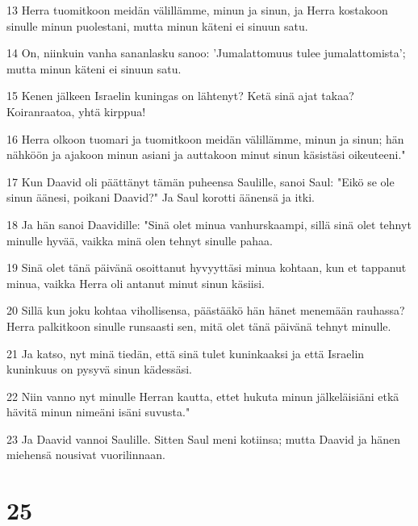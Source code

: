 \par 13 Herra tuomitkoon meidän välillämme, minun ja sinun, ja Herra kostakoon sinulle minun puolestani, mutta minun käteni ei sinuun satu.
\par 14 On, niinkuin vanha sananlasku sanoo: 'Jumalattomuus tulee jumalattomista'; mutta minun käteni ei sinuun satu.
\par 15 Kenen jälkeen Israelin kuningas on lähtenyt? Ketä sinä ajat takaa? Koiranraatoa, yhtä kirppua!
\par 16 Herra olkoon tuomari ja tuomitkoon meidän välillämme, minun ja sinun; hän nähköön ja ajakoon minun asiani ja auttakoon minut sinun käsistäsi oikeuteeni."
\par 17 Kun Daavid oli päättänyt tämän puheensa Saulille, sanoi Saul: "Eikö se ole sinun äänesi, poikani Daavid?" Ja Saul korotti äänensä ja itki.
\par 18 Ja hän sanoi Daavidille: "Sinä olet minua vanhurskaampi, sillä sinä olet tehnyt minulle hyvää, vaikka minä olen tehnyt sinulle pahaa.
\par 19 Sinä olet tänä päivänä osoittanut hyvyyttäsi minua kohtaan, kun et tappanut minua, vaikka Herra oli antanut minut sinun käsiisi.
\par 20 Sillä kun joku kohtaa vihollisensa, päästääkö hän hänet menemään rauhassa? Herra palkitkoon sinulle runsaasti sen, mitä olet tänä päivänä tehnyt minulle.
\par 21 Ja katso, nyt minä tiedän, että sinä tulet kuninkaaksi ja että Israelin kuninkuus on pysyvä sinun kädessäsi.
\par 22 Niin vanno nyt minulle Herran kautta, ettet hukuta minun jälkeläisiäni etkä hävitä minun nimeäni isäni suvusta."
\par 23 Ja Daavid vannoi Saulille. Sitten Saul meni kotiinsa; mutta Daavid ja hänen miehensä nousivat vuorilinnaan.

\chapter{25}

